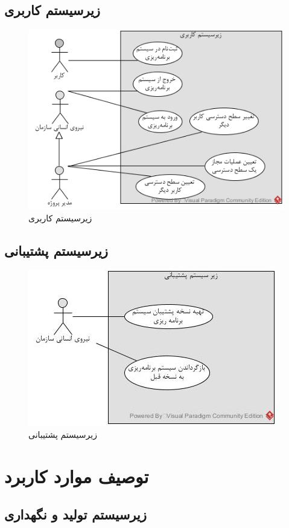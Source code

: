 \subsection{زیرسیستم کاربری}
\begin{figure}[H]
	\centering
	\includegraphics[scale=0.9]{img/usecase/user}
	\caption{زیرسیستم کاربری}
\end{figure}

\subsection{زیرسیستم پشتیبانی}
\begin{figure}[H]
	\centering
	\includegraphics[scale=1]{img/usecase/support}
	\caption{زیرسیستم پشتیبانی}
\end{figure}

\newpage
\section{توصیف موارد کاربرد}
\subsection{زیرسیستم تولید و نگهداری}


